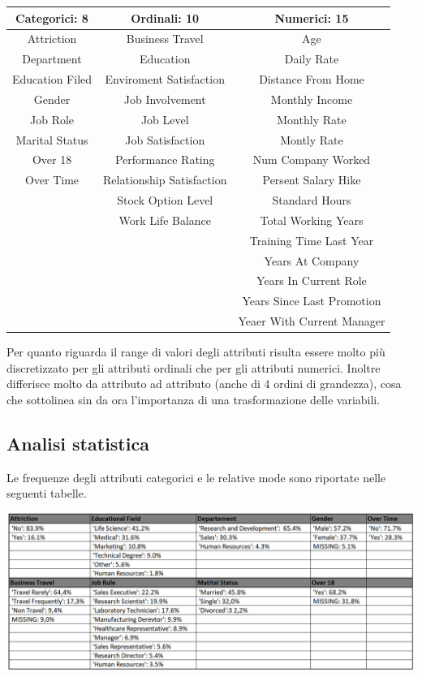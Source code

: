 \documentclass[a4paper,9pt]{article}
\begin{document}
\begin{center}
\begin{tabular}{c|c|c}
\toprule
\bfseries Categorici: 8 &\bfseries Ordinali: 10 & \bfseries Numerici: 15 \\
\midrule
Attriction & Business Travel & Age \\
Department & Education & Daily Rate \\
Education Filed & Enviroment Satisfaction & Distance From Home \\
Gender & Job Involvement & Monthly Income \\
Job Role & Job Level & Monthly Rate\\
Marital Status & Job Satisfaction & Montly Rate\\
Over 18 & Performance Rating & Num Company Worked\\
Over Time & Relationship Satisfaction & Persent Salary Hike\\
& Stock Option Level & Standard Hours\\
& Work Life Balance & Total Working Years\\
& &Training Time Last Year\\
& & Years At Company\\
& & Years In Current Role\\
& & Years Since Last Promotion\\
& & Yeaer With Current Manager\\
\bottomrule 
\end{tabular}
\end{center}

Per quanto riguarda il range di valori degli attributi risulta essere molto più discretizzato per gli attributi ordinali che per gli attributi numerici. Inoltre differisce molto da attributo ad attributo (anche di 4 ordini di grandezza), cosa che sottolinea sin da  ora l'importanza di una trasformazione delle variabili.

\subsection{Analisi statistica}
Le frequenze degli attributi categorici e le relative mode sono riportate nelle seguenti tabelle.

\begin{center}
\includegraphics[scale=1.28]{frequenza attributi nominali.png}
\end{center}
\end{document}
